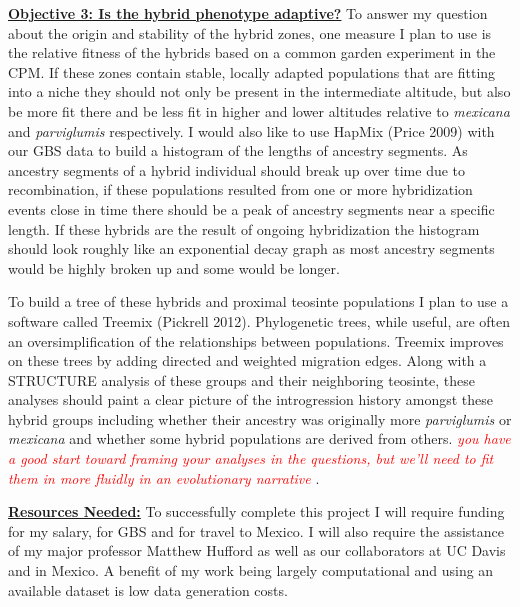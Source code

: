 \documentclass[12pt]{amsart}
\newcommand{\mbh}[1]{\textcolor{red}{ \emph{\scriptsize  #1}} }
\begin{document}
\hfill\break \textbf{\underline{Objective 3: Is the hybrid phenotype adaptive?} }To answer my question about the origin and stability of the hybrid zones, one measure I plan to use is the relative fitness of the hybrids based on a common garden experiment in the CPM. 
If these zones contain stable, locally adapted populations that are fitting into a niche they should not only be present in the intermediate altitude, but also be more fit there and be less fit in higher and lower altitudes relative to \textit{mexicana} and \textit{parviglumis} respectively.
I would also like to use HapMix (Price 2009) with our GBS data to build a histogram of the lengths of ancestry segments.
As ancestry segments of a hybrid individual should break up over time due to recombination, if these populations resulted from one or more hybridization events close in time there should be a peak of ancestry segments near a specific length.
If these hybrids are the result of ongoing hybridization the histogram should look roughly like an exponential decay graph as most ancestry segments would be highly broken up and some would be longer.%

To build a tree of these hybrids and proximal teosinte populations I plan to use a software called Treemix (Pickrell 2012).
Phylogenetic trees, while useful, are often an oversimplification of the relationships between populations. %
Treemix improves on these trees by adding directed and weighted migration edges. %
Along with a STRUCTURE analysis of these groups and their neighboring teosinte, these analyses should paint a clear picture of the introgression history amongst these hybrid groups including whether their ancestry was originally more \textit{parviglumis} or \textit{mexicana} and whether some hybrid populations are derived from others.
\mbh{you have a good start toward framing your analyses in the questions, but we'll need to fit them in more fluidly in an evolutionary narrative}.

\hfill\break \textbf{\underline{Resources Needed:} } To successfully complete this project I will require funding for my salary, for GBS and for travel to Mexico.  I will also require the assistance of my major professor Matthew Hufford as well as our collaborators at UC Davis and in Mexico.
A benefit of my work being largely computational and using an available dataset is low data generation costs.
\end{document}
